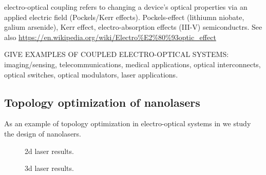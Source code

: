 electro-optical coupling refers to changing a device’s optical properties via an applied electric field (Pockels/Kerr effects). Pockels-effect (lithiumn niobate, galium arsenide), Kerr effect, electro-absorption effects (III-V) semiconductrs.
See also \url{https://en.wikipedia.org/wiki/Electro%E2%80%93optic_effect}

GIVE EXAMPLES OF COUPLED ELECTRO-OPTICAL SYSTEMS: imaging/sensing, telecommunications,
medical applications, optical interconnects, optical switches, optical modulators,
laser applications.

\subsection*{Topology optimization of nanolasers \cite{ownpub4}}

As an example of topology optimization in electro-optical systems in \cite{ownpub4} we study the design of nanolasers. 

\begin{figure}[tb]
    \centering
    \caption{2d laser results.}
    \label{fig:laser3d}
\end{figure}



\begin{figure}[tb]
    \centering
    \caption{3d laser results.}
    \label{fig:laser3d}
\end{figure}
